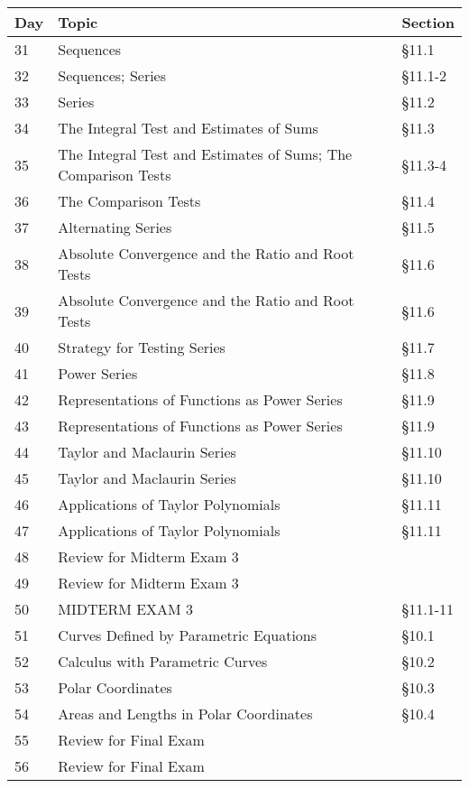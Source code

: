 \documentclass[11pt]{article}
\begin{document}
\begin{tabular}{|l|l|l|} %
\hline
Day& Topic &  Section\\
\hline 
31&Sequences&\S11.1  \\
32&Sequences; Series&\S11.1-2  \\
33&Series&\S11.2  \\

34&The Integral Test and Estimates of Sums&\S11.3  \\
35&The Integral Test and Estimates of Sums; The Comparison Tests&\S11.3-4  \\
36&The Comparison Tests&\S11.4  \\
37&Alternating Series&\S11.5  \\
38&Absolute Convergence and the Ratio and Root Tests&\S11.6  \\
39&Absolute Convergence and the Ratio and Root Tests&\S11.6  \\
40&Strategy for Testing Series&\S11.7  \\
41&Power Series&\S11.8  \\
42&Representations of Functions as Power Series&\S11.9  \\
43&Representations of Functions as Power Series&\S11.9  \\
44& Taylor and Maclaurin Series&\S11.10  \\
45& Taylor and Maclaurin Series&\S11.10  \\
46&Applications of Taylor Polynomials&\S11.11  \\
47&Applications of Taylor Polynomials&\S11.11  \\
48&Review for Midterm Exam 3& \\
49&Review for Midterm Exam 3& \\
\hline
50&MIDTERM EXAM 3&\S11.1-11 \\
\hline
51&Curves Defined by Parametric Equations&\S 10.1  \\ 
52&Calculus with Parametric Curves&\S 10.2 \\ 
53&Polar Coordinates&\S  10.3 \\ 
54&Areas and Lengths in Polar Coordinates&\S 10.4 \\ 
55&Review for Final Exam& \\ 
56&Review for Final Exam&  \\ 

\hline

\end{tabular}
\end{document}

